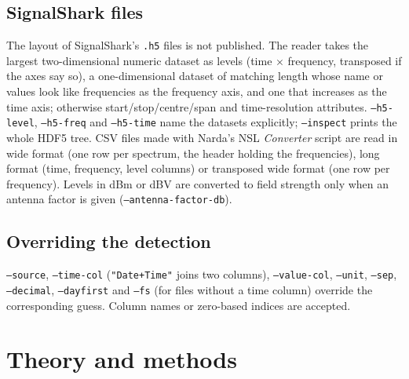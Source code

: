 \documentclass[10pt,letterpaper]{article}
\numberwithin{equation}{section}
\begin{document}
\subsection{SignalShark files}
The layout of SignalShark's \texttt{.h5} files is not published. The reader
takes the largest two-dimensional numeric dataset as levels (time $\times$
frequency, transposed if the axes say so), a one-dimensional dataset of matching
length whose name or values look like frequencies as the frequency axis, and one
that increases as the time axis; otherwise start/stop/centre/span and
time-resolution attributes. \texttt{--h5-level}, \texttt{--h5-freq} and
\texttt{--h5-time} name the datasets explicitly; \texttt{--inspect} prints the
whole HDF5 tree. CSV files made with Narda's NSL \emph{Converter} script
\cite{R8} are read in wide format (one row per spectrum, the header holding the
frequencies), long format (time, frequency, level columns) or transposed wide
format (one row per frequency). Levels in dBm or dB\textmu V are converted to
field strength only when an antenna factor is given (\texttt{--antenna-factor-db}).

\subsection{Overriding the detection}\label{sec:overrides}
\texttt{--source}, \texttt{--time-col} (\texttt{"Date+Time"} joins two columns),
\texttt{--value-col}, \texttt{--unit}, \texttt{--sep}, \texttt{--decimal},
\texttt{--dayfirst} and \texttt{--fs} (for files without a time column) override
the corresponding guess. Column names or zero-based indices are accepted.

\section{Theory and methods}\label{sec:theory}
\end{document}
